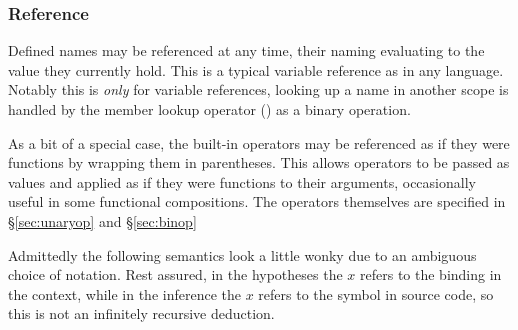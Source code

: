 \subsubsection{Reference}

Defined names may be referenced at any time, their naming evaluating to the value
they currently hold. This is a typical variable reference as in any language.
Notably this is \emph{only} for variable references, looking up a name in another
scope is handled by the member lookup operator () as a binary operation.

As a bit of a special case, the built-in operators may be referenced as if they
were functions by wrapping them in parentheses. This allows operators to be passed
as values and applied as if they were functions to their arguments, occasionally
useful in some functional compositions. The operators themselves are specified
in \S\ref{sec:unaryop} and \S\ref{sec:binop}

\begin{bnf*}
\end{bnf*}

Admittedly the following semantics look a little wonky due to an ambiguous choice
of notation. Rest assured, in the hypotheses the $x$ refers to the binding in the
context, while in the inference the $x$ refers to the symbol in source code, so
this is not an infinitely recursive deduction.

\begin{prooftree}
\end{prooftree}

